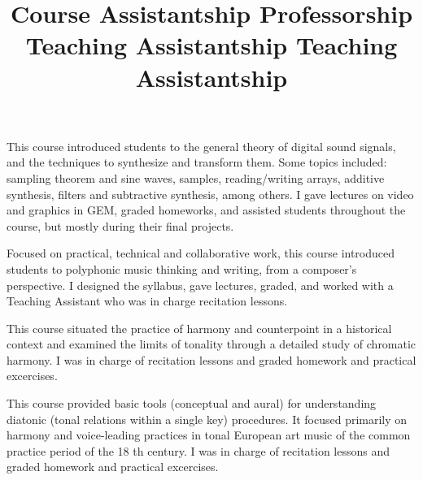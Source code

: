 \title{ Course Assistantship }
\begin{position}
This course introduced students to the general theory of digital sound signals, and the techniques to synthesize and transform them. Some topics included: sampling theorem and sine waves, samples, reading/writing arrays, additive synthesis, filters and subtractive synthesis, among others. I gave lectures on video and graphics in GEM, graded homeworks, and assisted students throughout the course, but mostly during their final projects.
\end{position}

\title{ Professorship }
\begin{position} 
Focused on practical, technical and collaborative work, this course introduced students to polyphonic music thinking and writing, from a composer's perspective. I designed the syllabus, gave lectures, graded, and worked with a Teaching Assistant who was in charge recitation lessons. 
\end{position}


\title{ Teaching Assistantship }
\begin{position}
This course situated the practice of harmony and counterpoint in a historical
context and examined the limits of tonality through a detailed study of chromatic harmony. I was in charge of recitation lessons and graded homework and practical excercises. 
\end{position}

\title{ Teaching Assistantship }
\begin{position}
This course provided basic tools (conceptual and aural) for understanding diatonic (tonal relations within a single key) procedures. It focused primarily on harmony and voice-leading practices in tonal European art music of the common practice period of the 18 th century. I was in charge of recitation lessons and graded homework and practical excercises.
\end{position}

